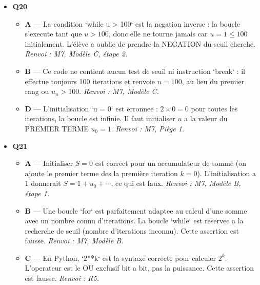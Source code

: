 \begin{itemize}
\begin{itemize}
    \item \textbf{C} — L'élève a execute deux iterations : $u_1 = 7$, $u_2 = 3 \times 7 + 1 = 22$... mais a renvoye 21 par une erreur de calcul ($3 \times 7 = 21$ en oubliant $+1$). Erreur arithmétique lors de la simulation. \emph{Renvoi : M7, Modèle A.}
    \item \textbf{D} — L'élève a execute deux iterations correctement ($u_1 = 7$, $u_2 = 22$) mais a arrete après deux tours. Il a confondu range(3) = $\{0, 1, 2\}$ (3 iterations) avec 2 iterations. \emph{Renvoi : M7, Piège 3.}
  \end{itemize}
  \item \textbf{Q20}
  \begin{itemize}
    \item \textbf{A} — La condition `while u > 100` est la negation inverse : la boucle s'execute tant que $u > 100$, donc elle ne tourne jamais car $u = 1 \leq 100$ initialement. L'élève a oublie de prendre la NEGATION du seuil cherche. \emph{Renvoi : M7, Modèle C, étape 2.}
    \item \textbf{B} — Ce code ne contient aucun test de seuil ni instruction `break` : il effectue toujours 100 iterations et renvoie $n=100$, au lieu du premier rang ou $u_n>100$. \emph{Renvoi : M7, Modèle C.}
    \item \textbf{D} — L'initialisation `u = 0` est erronnee : $2 \times 0 = 0$ pour toutes les iterations, la boucle est infinie. Il faut initialiser $u$ a la valeur du PREMIER TERME $u_0 = 1$. \emph{Renvoi : M7, Piège 1.}
  \end{itemize}
  \item \textbf{Q21}
  \begin{itemize}
    \item \textbf{A} — Initialiser $S = 0$ est correct pour un accumulateur de somme (on ajoute le premier terme des la première iteration $k = 0$). L'initialisation a $1$ donnerait $S = 1 + u_0 + \cdots$, ce qui est faux. \emph{Renvoi : M7, Modèle B, étape 1.}
    \item \textbf{B} — Une boucle `for` est parfaitement adaptee au calcul d'une somme avec un nombre connu d'iterations. La boucle `while` est reservee a la recherche de seuil (nombre d'iterations inconnu). Cette assertion est fausse. \emph{Renvoi : M7, Modèle B.}
    \item \textbf{C} — En Python, `2**k` est la syntaxe correcte pour calculer $2^k$. L'operateur \code{\textasciicircum} est le OU exclusif bit a bit, pas la puissance. Cette assertion est fausse. \emph{Renvoi : R5.}
  \end{itemize}
\end{itemize}
\fi
